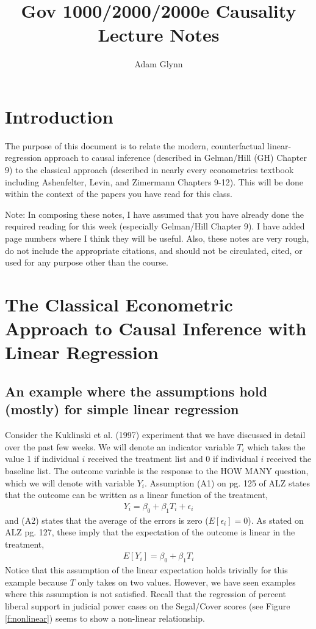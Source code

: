 \documentclass{article}
\title{Gov 1000/2000/2000e Causality Lecture Notes}
\author{Adam Glynn}
\date{}
\begin{document}
\maketitle

\double

\section{Introduction}

The purpose of this document is to relate the modern, counterfactual linear-regression approach to causal inference (described in Gelman/Hill (GH) Chapter 9) to the classical approach (described in nearly every econometrics textbook including Ashenfelter, Levin, and Zimermann Chapters 9-12). This will be done within the context of the papers you have read for this class. 

Note: In composing these notes, I have assumed that you have already done the required reading for this week (especially Gelman/Hill Chapter 9). I have added page numbers where I think they will be useful. Also, these notes are very rough, do not include the appropriate citations, and should not be circulated, cited, or used for any purpose other than the course.



\section{The Classical Econometric Approach to Causal Inference with Linear Regression}


\subsection{An example where the assumptions hold (mostly) for simple linear regression} 

Consider the Kuklinski et al. (1997) experiment that we have discussed in detail over the past few weeks. We will denote an indicator variable $T_i$ which takes the value 1 if individual $i$ received the treatment list and 0 if individual $i$ received the baseline list. The outcome variable is the response to the HOW MANY question, which we will denote with variable $Y_i$. Assumption (A1) on pg. 125 of ALZ states that the outcome can be written as a linear function of the treatment, 
\begin{align*}
Y_i = \beta_0 + \beta_1 T_i + \epsilon_i
\end{align*}
and (A2) states that the average of the errors is zero ($E[\epsilon_i]=0$). As stated on ALZ pg. 127, these imply that the  expectation of the outcome is linear in the treatment, 
\begin{align*}
E[Y_i] = \beta_0 + \beta_1 T_i
\end{align*}
Notice that this assumption of the linear expectation holds trivially for this example because $T$ only takes on two values. However, we have seen examples where this assumption is not satisfied. Recall that the regression of percent liberal support in judicial power cases on the Segal/Cover scores (see Figure \ref{f:nonlinear}) seems to show a non-linear relationship. 
\end{document}
